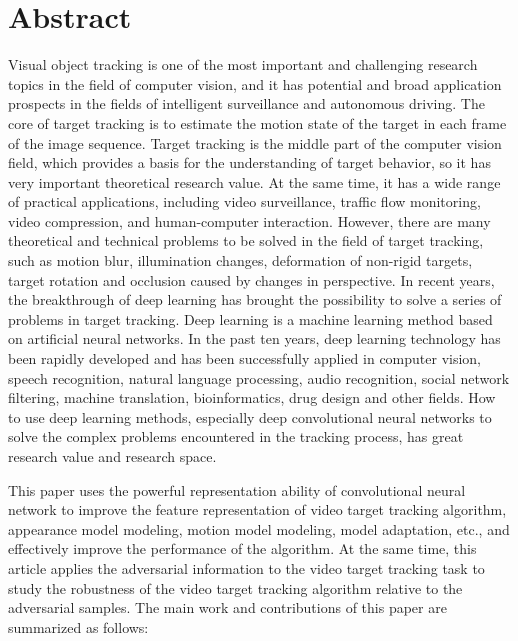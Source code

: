 
\intobmk\chapter*{Abstract}%

Visual object tracking is one of the most important and challenging research topics in the field of computer vision, and it has potential and broad application prospects in the fields of intelligent surveillance and autonomous driving. The core of target tracking is to estimate the motion state of the target in each frame of the image sequence. Target tracking is the middle part of the computer vision field, which provides a basis for the understanding of target behavior, so it has very important theoretical research value. At the same time, it has a wide range of practical applications, including video surveillance, traffic flow monitoring, video compression, and human-computer interaction.
However, there are many theoretical and technical problems to be solved in the field of target tracking, such as motion blur, illumination changes, deformation of non-rigid targets, target rotation and occlusion caused by changes in perspective. In recent years, the breakthrough of deep learning has brought the possibility to solve a series of problems in target tracking.
Deep learning is a machine learning method based on artificial neural networks. In the past ten years, deep learning technology has been rapidly developed and has been successfully applied in computer vision, speech recognition, natural language processing, audio recognition, social network filtering, machine translation, bioinformatics, drug design and other fields. How to use deep learning methods, especially deep convolutional neural networks to solve the complex problems encountered in the tracking process, has great research value and research space.

This paper uses the powerful representation ability of convolutional neural network to improve the feature representation of video target tracking algorithm, appearance model modeling, motion model modeling, model adaptation, etc., and effectively improve the performance of the algorithm. At the same time, this article applies the adversarial information to the video target tracking task to study the robustness of the video target tracking algorithm relative to the adversarial samples. The main work and contributions of this paper are summarized as follows:

